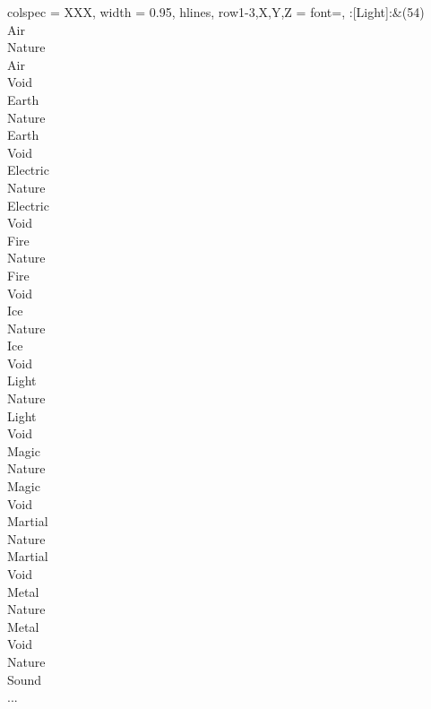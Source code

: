 \begin{longtblr}[
	caption = {2v1 Defending Weak},
	label = {2v1-Defending-Weak},
]{
	colspec = {XXX}, width = 0.95\linewidth,
	hlines,
	row{1-3,X,Y,Z} = {font=\bfseries},
}
	:[Light]:&{(54)\\
	Air \\
	Nature \\
	Air \\
	Void \\
	Earth \\
	Nature \\
	Earth \\
	Void \\
	Electric \\
	Nature \\
	Electric \\
	Void \\
	Fire \\
	Nature \\
	Fire \\
	Void \\
	Ice \\
	Nature \\
	Ice \\
	Void \\
	Light \\
	Nature \\
	Light \\
	Void \\
	Magic \\
	Nature \\
	Magic \\
	Void \\
	Martial \\
	Nature \\
	Martial \\
	Void \\
	Metal \\
	Nature \\
	Metal \\
	Void \\
	Nature \\
	Sound \\
	...\\
	}\\


\end{longtblr}
